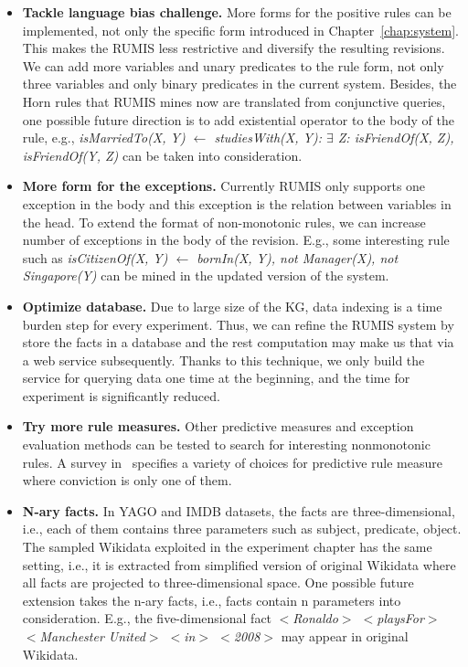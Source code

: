 \begin{itemize}
\item \textbf{Tackle language bias challenge.} More forms for the positive rules can be implemented, not only the specific form introduced in Chapter~\ref{chap:system}. This makes the RUMIS less restrictive and diversify the resulting revisions. We can add more variables and unary predicates to the rule form, not only three variables and only binary predicates in the current system. Besides, the Horn rules that RUMIS mines now are translated from conjunctive queries, one possible future direction is to add existential operator to the body of the rule, e.g., \textit{isMarriedTo(X, Y) $\leftarrow$ studiesWith(X, Y): $\exists$ Z: isFriendOf(X, Z), isFriendOf(Y, Z)} can be taken into consideration.
\item \textbf{More form for the exceptions.} Currently RUMIS only supports one exception in the body and this exception is the relation between variables in the head. To extend the format of non-monotonic rules, we can increase number of exceptions in the body of the revision. E.g., some interesting rule such as \textit{isCitizenOf(X, Y) $\leftarrow$ bornIn(X, Y), not Manager(X), not Singapore(Y)} can be mined in the updated version of the system.
\item \textbf{Optimize database.} Due to large size of the KG, data indexing is a time burden step for every experiment. Thus, we can refine the RUMIS system by store the facts in a database and the rest computation may make us that via a web service subsequently. Thanks to this technique, we only build the service for querying data one time at the beginning, and the time for experiment is significantly reduced.
\item \textbf{Try more rule measures.} Other predictive measures and exception evaluation methods can be tested to search for interesting nonmonotonic rules. A survey in~\cite{ref46} specifies a variety of choices for predictive rule measure where conviction is only one of them.
\item \textbf{N-ary facts.} In YAGO and IMDB datasets, the facts are three-dimensional, i.e., each of them contains three parameters such as subject, predicate, object. The sampled Wikidata exploited in the experiment chapter has the same setting, i.e., it is extracted from simplified version of original Wikidata where all facts are projected to three-dimensional space. One possible future extension takes the n-ary facts, i.e., facts contain n parameters into consideration. E.g., the five-dimensional fact \textit{$<$Ronaldo$>$ $<$playsFor$>$ $<$Manchester United$>$ $<$in$>$ $<$2008$>$} may appear in original Wikidata.

\end{itemize}
